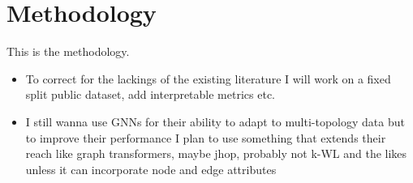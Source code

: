 \section*{Methodology}

This is the methodology.

\begin{itemize}
    \item To correct for the lackings of the existing literature I will work on a fixed split public dataset, add interpretable metrics etc.
    \item I still wanna use GNNs for their ability to adapt to multi-topology data but to improve their performance I plan to use something that extends their reach like graph transformers, maybe jhop, probably not k-WL and the likes unless it can incorporate node and edge attributes
\end{itemize}